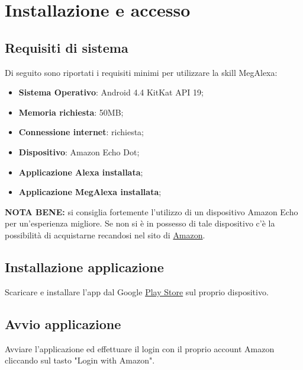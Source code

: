\chapter{Installazione e accesso}
\label{Installazione}

\section{Requisiti di sistema}
Di seguito sono riportati i requisiti minimi per utilizzare la skill MegAlexa:

\begin{itemize}
	\item \textbf{Sistema Operativo}: Android 4.4 KitKat API 19;
	\item \textbf{Memoria richiesta}: 50MB;
	\item \textbf{Connessione internet}: richiesta;
	\item \textbf{Dispositivo}: Amazon Echo Dot;
	\item \textbf{Applicazione Alexa installata};
	\item \textbf{Applicazione MegAlexa installata};
	
	
\end{itemize}

\textbf{NOTA BENE:} si consiglia fortemente l'utilizzo di un dispositivo Amazon Echo per un'esperienza migliore. Se non si è in possesso di tale dispositivo c'è la possibilità di acquistarne recandosi nel sito di \href{https://www.amazon.it}{Amazon}.

\section{Installazione applicazione}
Scaricare e installare l'app dal Google \href{https://play.google.com/store/apps?hl=it}{Play Store} sul proprio dispositivo.
\newpage
\section{Avvio applicazione}

Avviare l'applicazione ed effettuare il login con il proprio account Amazon cliccando sul tasto "Login with Amazon".

